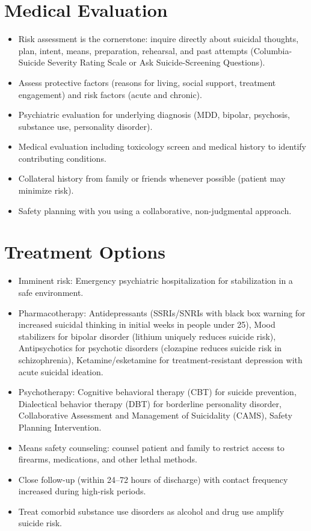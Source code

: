 \section*{Medical Evaluation}
\begin{itemize}
  \item Risk assessment is the cornerstone: inquire directly about suicidal thoughts, plan, intent, means, preparation, rehearsal, and past attempts (Columbia-Suicide Severity Rating Scale or Ask Suicide-Screening Questions).
  \item Assess protective factors (reasons for living, social support, treatment engagement) and risk factors (acute and chronic).
  \item Psychiatric evaluation for underlying diagnosis (MDD, bipolar, psychosis, substance use, personality disorder).
  \item Medical evaluation including toxicology screen and medical history to identify contributing conditions.
  \item Collateral history from family or friends whenever possible (patient may minimize risk).
  \item Safety planning with you using a collaborative, non-judgmental approach.
\end{itemize}

\section*{Treatment Options}
\begin{itemize}
  \item Imminent risk: Emergency psychiatric hospitalization for stabilization in a safe environment.
  \item Pharmacotherapy: Antidepressants (SSRIs/SNRIs with black box warning for increased suicidal thinking in initial weeks in people under 25), Mood stabilizers for bipolar disorder (lithium uniquely reduces suicide risk), Antipsychotics for psychotic disorders (clozapine reduces suicide risk in schizophrenia), Ketamine/esketamine for treatment-resistant depression with acute suicidal ideation.
  \item Psychotherapy: Cognitive behavioral therapy (CBT) for suicide prevention, Dialectical behavior therapy (DBT) for borderline personality disorder, Collaborative Assessment and Management of Suicidality (CAMS), Safety Planning Intervention.
  \item Means safety counseling: counsel patient and family to restrict access to firearms, medications, and other lethal methods.
  \item Close follow-up (within 24--72 hours of discharge) with contact frequency increased during high-risk periods.
  \item Treat comorbid substance use disorders as alcohol and drug use amplify suicide risk.
\end{itemize}


